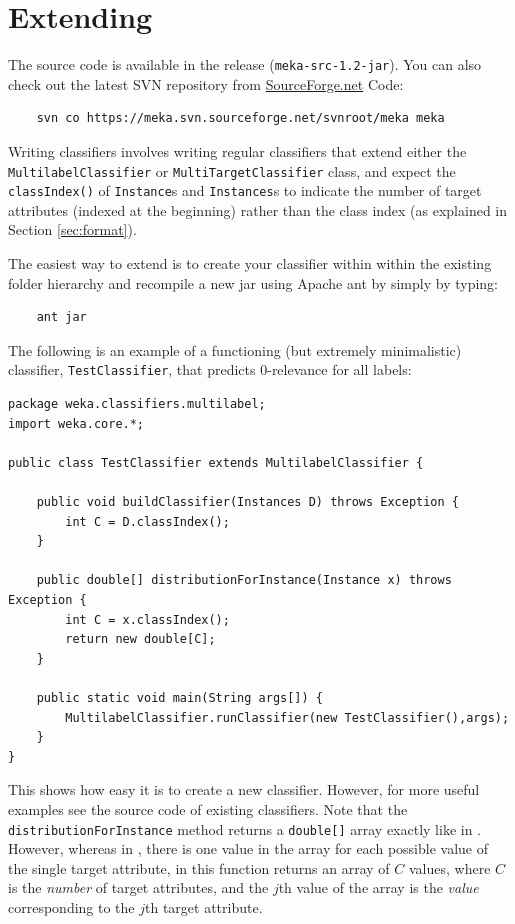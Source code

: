 \documentclass[11pt]{article}
\newcommand{\MEKA}{Meka}
\newcommand{\WEKA}{Weka}
\def\version{{\tt 1.2}}
\begin{document}
\section{\label{sec:extending}Extending \framework{\MEKA}}%

The source code is available in the release (\texttt{meka-src-\version-jar}). You can also check out the latest SVN repository from \url{SourceForge.net} \textsf{Code}: 
\begin{verbatim}
	svn co https://meka.svn.sourceforge.net/svnroot/meka meka 
\end{verbatim}

Writing \framework{\MEKA} classifiers involves writing regular \framework{\WEKA} classifiers that extend either the \texttt{MultilabelClassifier} or \texttt{MultiTargetClassifier} class, and expect the \texttt{classIndex()} of \texttt{Instance}s and \texttt{Instances}s to indicate the number of target attributes (indexed at the beginning) rather than the class index (as explained in Section \ref{sec:format}). 

The easiest way to extend \framework{\MEKA} is to create your classifier within within the existing \framework{\MEKA} folder hierarchy and recompile a new jar using Apache ant by simply by typing:
\begin{verbatim}
	ant jar
\end{verbatim}

The following is an example of a functioning (but extremely minimalistic) classifier, \texttt{TestClassifier}, that predicts $0$-relevance for all labels:

{\small
\begin{verbatim}
package weka.classifiers.multilabel;
import weka.core.*;

public class TestClassifier extends MultilabelClassifier {
	
    public void buildClassifier(Instances D) throws Exception {
        int C = D.classIndex();
    }
    
    public double[] distributionForInstance(Instance x) throws Exception {
        int C = x.classIndex();
       	return new double[C];
    }
    
    public static void main(String args[]) {
        MultilabelClassifier.runClassifier(new TestClassifier(),args);
    }
}
\end{verbatim}
}

This shows how easy it is to create a new classifier. However, for more useful examples see the source code of existing \framework{\MEKA} classifiers. Note that the \texttt{distributionForInstance} method returns a \texttt{double[]} array exactly like in \framework{\WEKA}. However, whereas in \framework{\WEKA}, there is one value in the array for each possible value of the single target attribute, in \framework{\MEKA} this function returns an array of $C$ values, where $C$ is the \emph{number} of target attributes, and the $j$th value of the array is the \emph{value} corresponding to the $j$th target attribute.
\end{document}
